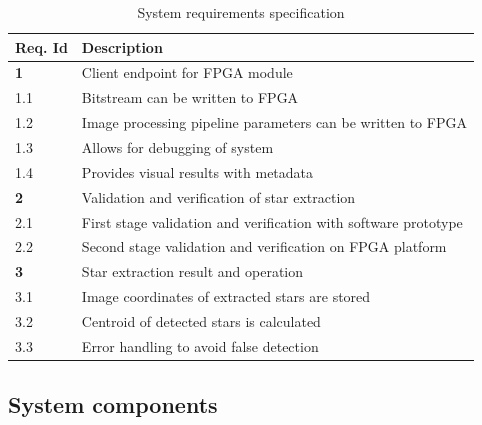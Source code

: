 \documentclass[12pt]{report}
\begin{document}
\begin{table}[h]
    \begin{tabular}{|p{1.75cm}|p{10cm}|}
        \hline
        \textbf{Req. Id}& \textbf{Description}\\
        \hline
        \hline
        \textbf{1}&Client endpoint for FPGA module\\
        \hline
        1.1\label{req1.1}&Bitstream can be written to FPGA\\
        1.2\label{req1.2}&Image processing pipeline parameters can be written to FPGA\\
        1.3\label{req1.3}&Allows for debugging of system\\
        1.4\label{req1.4}&Provides visual results with metadata\\
        \hline
        \hline
        \textbf{2}&Validation and verification of star extraction\\
        \hline
        2.1\label{req2.1}&First stage validation and verification with software prototype\\
        2.2\label{req2.2}&Second stage validation and verification on FPGA platform\\ 
        \hline
        \hline
        \textbf{3}&Star extraction result and operation\\
        \hline
        3.1\label{req3.1}&Image coordinates of extracted stars are stored\\
        3.2\label{req3.2}&Centroid of detected stars is calculated\\
        3.3\label{req3.3}&Error handling to avoid false detection\\
        \hline
    \end{tabular}
    \caption{System requirements specification}
    \label{table:sysreq}
\end{table}

\subsection{System components}
\end{document}
